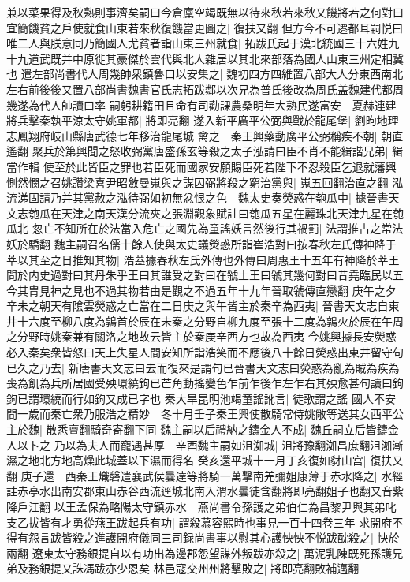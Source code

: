 兼以菜果得及秋熟則事濟矣嗣曰今倉廩空竭既無以待來秋若來秋又饑將若之何對曰宜簡饑貧之戶使就食山東若來秋復饑當更圖之|{
	復扶又翻}
但方今不可遷都耳嗣悦曰唯二人與朕意同乃簡國人尤貧者詣山東三州就食|{
	拓跋氏起于漠北統國三十六姓九十九道武既并中原徙其豪傑於雲代與北人雜居以其北來部落為國人山東三州定相冀也}
遣左部尚書代人周幾帥衆鎮魯口以安集之|{
	魏初四方四維置八部大人分東西南北左右前後後又置八部尚書魏書官氏志拓跋鄰以次兄為普氏後改為周氏盖魏建代都周幾遂為代人帥讀曰率}
嗣躬耕籍田且命有司勸課農桑明年大熟民遂富安　夏赫連建將兵擊秦執平涼太守姚軍都|{
	將即亮翻}
遂入新平廣平公弼與戰於龍尾堡|{
	劉昫地理志鳳翔府岐山縣唐武德七年移治龍尾城}
禽之　秦王興藥動廣平公弼稱疾不朝|{
	朝直遙翻}
聚兵於第興聞之怒收弼黨唐盛孫玄等殺之太子泓請曰臣不肖不能緝諧兄弟|{
	緝當作輯}
使至於此皆臣之罪也若臣死而國家安願賜臣死若陛下不忍殺臣乞退就藩興惻然憫之召姚讚梁喜尹昭斂曼嵬與之謀囚弼將殺之窮治黨與|{
	嵬五回翻治直之翻}
泓流涕固請乃并其黨赦之泓待弼如初無忿恨之色　魏太史奏熒惑在匏瓜中|{
	據晉書天文志匏瓜在天津之南天漢分流夾之張淵觀象賦註曰匏瓜五星在麗珠北天津九星在匏瓜北}
忽亡不知所在於法當入危亡之國先為童謠妖言然後行其禍罰|{
	法謂推占之常法妖於驕翻}
魏主嗣召名儒十餘人使與太史議熒惑所詣崔浩對曰按春秋左氏傳神降于莘以其至之日推知其物|{
	浩蓋據春秋左氏外傳也外傳曰周惠王十五年有神降於莘王問於内史過對曰其丹朱乎王曰其誰受之對曰在虢土王曰虢其幾何對曰昔堯臨民以五今其胄見神之見也不過其物若由是觀之不過五年十九年晉取虢傳直戀翻}
庚午之夕辛未之朝天有隂雲熒惑之亡當在二日庚之與午皆主於秦辛為西夷|{
	晉書天文志自東井十六度至柳八度為鶉首於辰在未秦之分野自柳九度至張十二度為鶉火於辰在午周之分野時姚秦兼有關洛之地故云皆主於秦庚辛西方也故為西夷}
今姚興據長安熒惑必入秦矣衆皆怒曰天上失星人間安知所詣浩笑而不應後八十餘日熒惑出東井留守句已久之乃去|{
	新唐書天文志曰去而復來是謂句已晉書天文志曰熒惑為亂為賊為疾為喪為飢為兵所居國受殃環繞鉤已芒角動搖變色乍前乍後乍左乍右其殃愈甚句讀曰鉤鉤已謂環繞而行如鉤又成已字也}
秦大旱昆明池竭童謠訛言|{
	徒歌謂之謠}
國人不安間一歲而秦亡衆乃服浩之精妙　冬十月壬子秦王興使散騎常侍姚敞等送其女西平公主於魏|{
	散悉亶翻騎奇寄翻下同}
魏主嗣以后禮納之鑄金人不成|{
	魏丘嗣立后皆鑄金人以卜之}
乃以為夫人而寵遇甚厚　辛酉魏主嗣如沮洳城|{
	沮將豫翻洳昌庶翻沮洳漸濕之地北方地高燥此城蓋以下濕而得名}
癸亥還平城十一月丁亥復如豺山宫|{
	復扶又翻}
庚子還　西秦王熾磐遣襄武侯曇達等將騎一萬擊南羌彌姐康薄于赤水降之|{
	水經註赤亭水出南安郡東山赤谷西流逕城北南入渭水曇徒含翻將即亮翻姐子也翻又音紫降戶江翻}
以王孟保為略陽太守鎮赤水　燕尚書令孫護之弟伯仁為昌黎尹與其弟叱支乙拔皆有才勇從燕王跋起兵有功|{
	謂殺慕容熙時也事見一百十四卷三年}
求開府不得有怨言跋皆殺之進護開府儀同三司録尚書事以慰其心護怏怏不悦跋酖殺之|{
	怏於兩翻}
遼東太守務銀提自以有功出為邊郡怨望謀外叛跋亦殺之|{
	萬泥乳陳既死孫護兄弟及務銀提又誅馮跋亦少恩矣}
林邑寇交州州將擊敗之|{
	將即亮翻敗補邁翻}


